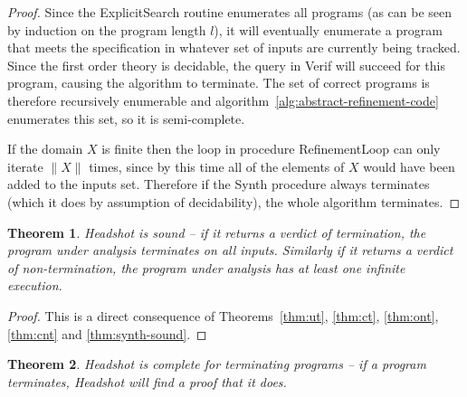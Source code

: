 \documentclass[preprint]{sigplanconf}
\newtheorem{theorem}{Theorem}
\theoremstyle{definition}
\begin{document}
\begin{proof}
 Since the {\sc ExplicitSearch} routine enumerates all programs (as can be seen by induction on
 the program length $l$), it will eventually enumerate a program that meets the specification
 in whatever set of inputs are currently being tracked.  Since the first order theory is
 decidable, the query in {\sc Verif} will succeed for this program, causing the algorithm to terminate.
 The set of correct programs is therefore recursively enumerable and algorithm~\ref{alg:abstract-refinement-code}
 enumerates this set, so it is semi-complete.

 If the domain $X$ is finite then the loop in procedure {\sc RefinementLoop} can only
 iterate $\| X \|$ times, since by this time all of the elements of $X$ would have been
 added to the inputs set.  Therefore if the {\sc Synth} procedure always terminates (which it does
 by assumption of decidability), the whole algorithm terminates.
\end{proof}


\begin{theorem}
\label{thm:sound}
 {\sc Headshot} is sound -- if it returns a verdict of termination, the program under
 analysis terminates on all inputs.  Similarly if it returns a verdict of non-termination,
 the program under analysis has at least one infinite execution.
\end{theorem}

\begin{proof}
 This is a direct consequence of Theorems~\ref{thm:ut}, \ref{thm:ct}, \ref{thm:ont}, \ref{thm:cnt} and \ref{thm:synth-sound}.
\end{proof}

\begin{theorem}
\label{thm:complete-termination}
 {\sc Headshot} is complete for terminating programs -- if a program terminates, {\sc Headshot} will find a proof that it does.
\end{theorem}
\end{document}
